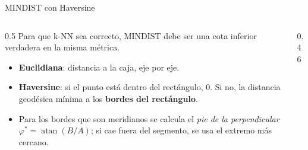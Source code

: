 \documentclass[aspectratio=169,10pt]{beamer}
\begin{document}
\begin{frame}{MINDIST con Haversine}
  \begin{columns}[c]
    \begin{column}{0.5\textwidth}
      \small
      Para que k-NN sea correcto, MINDIST debe ser una \alert{cota inferior verdadera} en la misma métrica.
      \begin{itemize}
        \item \textbf{Euclidiana}: distancia a la caja, eje por eje.
        \item \textbf{Haversine}: si el punto está dentro del rectángulo, 0. Si no, la distancia geodésica mínima a los \textbf{bordes del rectángulo}.
        \item Para los bordes que son meridianos se calcula el \emph{pie de la perpendicular} $\varphi^* = \operatorname{atan}(B/A)$; si cae fuera del segmento, se usa el extremo más cercano.
      \end{itemize}
    \end{column}
    \begin{column}{0.46\textwidth}
      \centering
    \end{column}
  \end{columns}
\end{frame}
\end{document}
